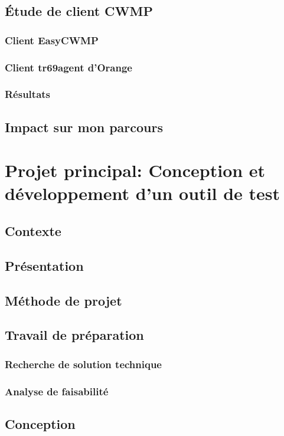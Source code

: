 \documentclass[12pt,a4paper]{report}
\begin{document}
\subsection{Étude de client CWMP}
\subsubsection{Client EasyCWMP}
\subsubsection{Client tr69agent d'Orange}
\subsubsection{Résultats} %
\subsection{Impact sur mon parcours}

\newpage
\section{Projet principal: Conception et développement d'un outil de test}
\subsection{Contexte}
\subsection{Présentation}
\subsection{Méthode de projet}
\subsection{Travail de préparation}
\subsubsection{Recherche de solution technique}
\subsubsection{Analyse de faisabilité}
\subsection{Conception}
\end{document}

